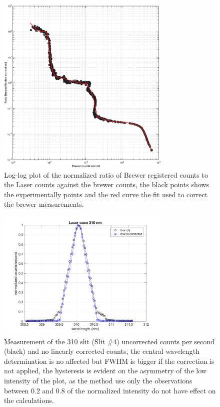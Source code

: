 \documentclass[acp]{copernicus} %
\begin{document}
\begin{figure}[t]
\includegraphics[width=8.3cm]{figures/General_NoLinearity_corr.eps}
\caption{ Log-log plot of the normalized ratio of Brewer registered counts to the Laser counts against the brewer counts, the black points shows the experimentally points and the red curve the fit used to correct the brewer measurements.}
\label{fig:no}
\end{figure}

\begin{figure}[t]
\includegraphics[width=8.3cm]{figures/General_Corrected_vs_uncorrected.png}
\caption{Measurement of the 310 slit (Slit \#4) uncorrected counts per second (black) and no linearly corrected counts, the central wavelength determination is no affected but FWHM is bigger if the correction is not applied, the hysteresis is evident on the asymmetry of the low intensity of the plot, as the method use only the observations between 0.2 and 0.8 of the normalized intensity do not have effect on the calculations.  }
\label{fig:slitcor}
\end{figure}

%
\end{document}
